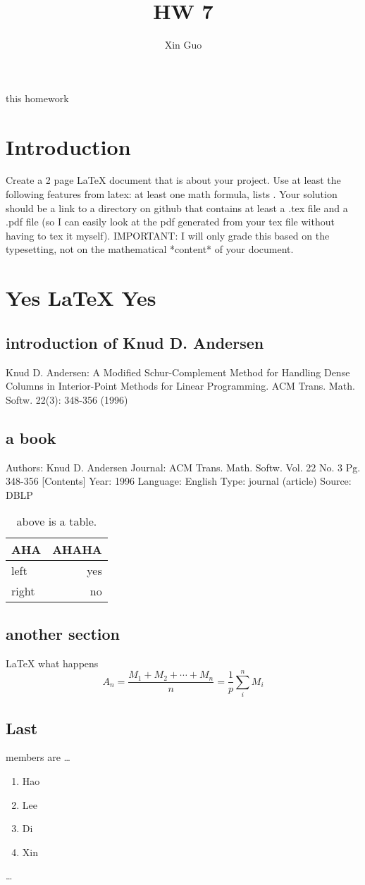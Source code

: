 \documentclass[13pt]{article}
\title{HW 7}
\author{Xin Guo}
\begin{document}
\maketitle

\begin{AHA}
this homework
\end{AHA}

\section{Introduction}

Create a 2 page LaTeX document that is about your project. Use at least the following features from latex: at least one math formula, lists . Your solution should be a link to a directory on github that contains at least a .tex file and a .pdf file (so I can easily look at the pdf generated from your tex file without having to tex it myself). IMPORTANT: I will only grade this based on the typesetting, not on the mathematical *content* of your document.

\section{Yes \LaTeX{} Yes}
\label{sec:examples}

\subsection{introduction of Knud D. Andersen}
Knud D. Andersen: A Modified Schur-Complement Method for Handling Dense Columns in Interior-Point Methods for Linear Programming. ACM Trans. Math. Softw. 22(3): 348-356 (1996)


\subsection{a book}


Authors: Knud D. Andersen 
Journal: ACM Trans. Math. Softw. Vol. 22 No. 3 Pg. 348-356 [Contents] 
Year: 1996 
Language: English 
Type: journal (article) 
Source: DBLP


\begin{table}
\centering
\begin{tabular}{l|r}
AHA & AHAHA \\\hline
left & yes \\
right & no
\end{tabular}
\caption{\label{tab:widgets}above is a table.}
\end{table}

\subsection{another section}

\LaTeX{} what happens 
$$A_n = \frac{M_1 + M_2 + \cdots + M_n}{n}
      = \frac{1}{p}\sum_{i}^{n} M_i$$


\subsection{Last}

members are \dots

\begin{enumerate}
\item Hao
\item Lee
\item Di
\item Xin
\end{enumerate}
\dots 
\end{document}
